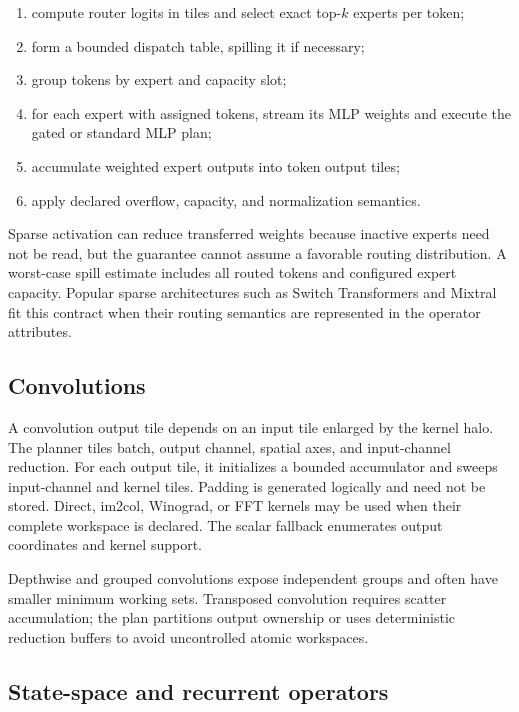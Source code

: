 \begin{enumerate}
  \item compute router logits in tiles and select exact top-$k$ experts per token;
  \item form a bounded dispatch table, spilling it if necessary;
  \item group tokens by expert and capacity slot;
  \item for each expert with assigned tokens, stream its MLP weights and execute the gated or standard MLP plan;
  \item accumulate weighted expert outputs into token output tiles;
  \item apply declared overflow, capacity, and normalization semantics.
\end{enumerate}

Sparse activation can reduce transferred weights because inactive experts need not be read, but the guarantee cannot assume a favorable routing distribution. A worst-case spill estimate includes all routed tokens and configured expert capacity. Popular sparse architectures such as Switch Transformers \cite{fedus2021switch} and Mixtral \cite{jiang2024mixtral} fit this contract when their routing semantics are represented in the operator attributes.

\subsection{Convolutions}

A convolution output tile depends on an input tile enlarged by the kernel halo. The planner tiles batch, output channel, spatial axes, and input-channel reduction. For each output tile, it initializes a bounded accumulator and sweeps input-channel and kernel tiles. Padding is generated logically and need not be stored. Direct, im2col, Winograd, or FFT kernels may be used when their complete workspace is declared. The scalar fallback enumerates output coordinates and kernel support.

Depthwise and grouped convolutions expose independent groups and often have smaller minimum working sets. Transposed convolution requires scatter accumulation; the plan partitions output ownership or uses deterministic reduction buffers to avoid uncontrolled atomic workspaces.

\subsection{State-space and recurrent operators}

